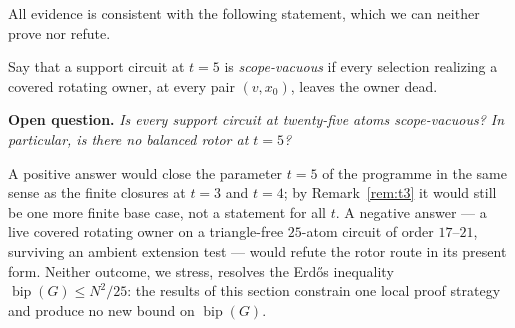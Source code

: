 All evidence is consistent with the following statement, which we can
neither prove nor refute.

\begin{definition}
Say that a support circuit at \(t=5\) is \emph{scope-vacuous} if every
selection realizing a covered rotating owner, at every pair
\((v,x_0)\), leaves the owner dead.
\end{definition}

\noindent\textbf{Open question.}
\emph{Is every support circuit at twenty-five atoms scope-vacuous?
In particular, is there no balanced rotor at \(t=5\)?}

\medskip

A positive answer would close the parameter \(t=5\) of the programme
in the same sense as the finite closures at \(t=3\) and \(t=4\); by
Remark~\ref{rem:t3} it would still be one more finite base case, not a
statement for all \(t\). A negative answer --- a live covered rotating
owner on a triangle-free \(25\)-atom circuit of order \(17\)--\(21\),
surviving an ambient extension test --- would refute the rotor route
in its present form. Neither outcome, we stress, resolves the Erd\H{o}s inequality
\(\operatorname{bip}(G)\le N^2/25\): the results of this section
constrain one local proof strategy and produce no new bound on
\(\operatorname{bip}(G)\).

